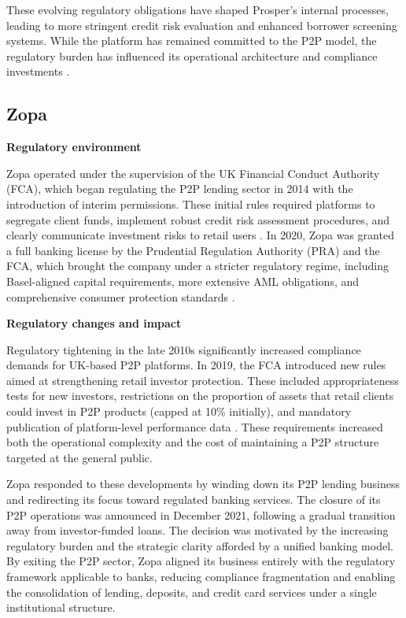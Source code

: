\documentclass[pdflatex,sn-apa]{sn-jnl}%
\theoremstyle{thmstyleone}%
\theoremstyle{thmstyletwo}%
\theoremstyle{thmstylethree}%
\begin{document}
These evolving regulatory obligations have shaped Prosper’s internal processes, leading to more stringent credit risk evaluation and enhanced borrower screening systems. While the platform has remained committed to the P2P model, the regulatory burden has influenced its operational architecture and compliance investments \citep{knowledge_at_wharton_peer--peer_2014}.

\subsection{Zopa}

\textbf{Regulatory environment}

Zopa operated under the supervision of the UK Financial Conduct Authority (FCA), which began regulating the P2P lending sector in 2014 with the introduction of interim permissions. These initial rules required platforms to segregate client funds, implement robust credit risk assessment procedures, and clearly communicate investment risks to retail users \citep{fca_fca_2019}. In 2020, Zopa was granted a full banking license by the Prudential Regulation Authority (PRA) and the FCA, which brought the company under a stricter regulatory regime, including Basel-aligned capital requirements, more extensive AML obligations, and comprehensive consumer protection standards \citep{finextra_p2p_2016,zopa_bank_limited_about_nodate}.

\textbf{Regulatory changes and impact}

Regulatory tightening in the late 2010s significantly increased compliance demands for UK-based P2P platforms. In 2019, the FCA introduced new rules aimed at strengthening retail investor protection. These included appropriateness tests for new investors, restrictions on the proportion of assets that retail clients could invest in P2P products (capped at 10\% initially), and mandatory publication of platform-level performance data \citep{fca_ps1914_2018}. These requirements increased both the operational complexity and the cost of maintaining a P2P structure targeted at the general public.

Zopa responded to these developments by winding down its P2P lending business and redirecting its focus toward regulated banking services. The closure of its P2P operations was announced in December 2021, following a gradual transition away from investor-funded loans. The decision was motivated by the increasing regulatory burden and the strategic clarity afforded by a unified banking model. By exiting the P2P sector, Zopa aligned its business entirely with the regulatory framework applicable to banks, reducing compliance fragmentation and enabling the consolidation of lending, deposits, and credit card services under a single institutional structure.
\end{document}
